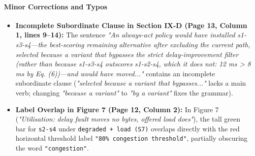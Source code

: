 \documentclass[11pt,a4paper]{article}
\begin{document}
\paragraph{Minor Corrections and Typos}
\begin{itemize}[leftmargin=1.8em,itemsep=2pt]
\item \textbf{Incomplete Subordinate Clause in Section IX-D (Page 13, Column 1, lines 9–14):} The sentence \emph{"An always-act policy would have installed s1-s3-s4—the best-scoring remaining alternative after excluding the current path, selected because a variant that bypasses the strict delay-improvement filter (rather than because s1-s3-s4 outscores s1-s2-s4, which it does not: 12 ms > 8 ms by Eq. (6))—and would have moved..."} contains an incomplete subordinate clause (\emph{"selected because a variant that bypasses..."} lacks a main verb; changing \emph{"because a variant"} to \emph{"by a variant"} fixes the grammar).
\end{itemize}
\begin{itemize}[leftmargin=1.8em,itemsep=2pt]
\item \textbf{Label Overlap in Figure 7 (Page 12, Column 2):} In Figure 7 (\emph{"Utilisation: delay fault moves no bytes, offered load does"}), the tall green bar for \texttt{s2-s4} under \texttt{degraded + load (S7)} overlaps directly with the red horizontal threshold label \texttt{"80\% congestion threshold"}, partially obscuring the word \texttt{"congestion"}.
\end{itemize}
\end{document}
